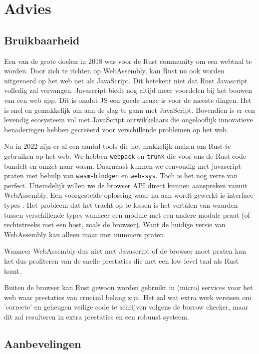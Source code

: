 \chapter{Advies}

\section{Bruikbaarheid}

Een van de grote doelen in 2018 was voor de Rust community om een webtaal te worden. Door zich te
richten op WebAssembly, kan Rust nu ook worden uitgevoerd op het web net als JavaScript. Dit
betekent niet dat Rust Javascript volledig zal vervangen. Javascript biedt nog altijd meer voordelen
bij het bouwen van een web app. Dit is omdat JS een goede keuze is voor de meeste dingen. Het is
snel en gemakkelijk om aan de slag te gaan met JavaScript. Bovendien is er een levendig ecosysteem
vol met JavaScript ontwikkelaars die ongelooflijk innovatieve benaderingen hebben gecreëerd voor
verschillende problemen op het web.

Nu in 2022 zijn er al een aantal tools die het makkelijk maken om Rust te gebruiken op het web. We
hebben \texttt{webpack} en \texttt{trunk} die voor ons de Rust code bundelt en
omzet naar wasm. Daarnaast kunnen we eenvoudig met javascript praten met behulp van
\texttt{wasm-bindgen} en \texttt{web-sys}. Toch is het nog verre van perfect.
Uiteindelijk willen we de browser API direct kunnen aanspreken vanuit WebAssembly. Een voorgestelde
oplossing waar nu aan wordt gewerkt is interface types \cite{wasm_interfaces}. Het probleem dat het
tracht op te lossen is het vertalen van waarden tussen verschillende types wanneer een module met
een andere module praat (of rechtstreeks met een host, zoals de browser). Want de huidige versie van
WebAssembly kan alleen maar met nummers praten. 

Wanneer WebAssembly dus niet met Javascript of de browser moet praten kan het dus profiteren van de
snelle prestaties die met een low level taal als Rust komt.

Buiten de browser kan Rust gewoon worden gebruikt in (micro) services voor het web waar prestaties
van cruciaal belang zijn. Het zal wat extra werk vereisen om 'correcte' en geheugen veilige code te
schrijven volgens de borrow checker, maar dit zal resulteren in extra prestaties en een robuust
systeem.

\clearpage

\section{Aanbevelingen}

